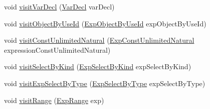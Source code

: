 \begin{DoxyCompactItemize}
\item 
void \hyperlink{classorg_1_1tzi_1_1use_1_1analysis_1_1coverage_1_1_abstract_coverage_visitor_abaab1e59addef8d8b34b31d113a7fd7b}{visit\-Var\-Decl} (\hyperlink{classorg_1_1tzi_1_1use_1_1uml_1_1ocl_1_1expr_1_1_var_decl}{Var\-Decl} var\-Decl)
\item 
void \hyperlink{classorg_1_1tzi_1_1use_1_1analysis_1_1coverage_1_1_abstract_coverage_visitor_a5b4a9ec8d6407ecd1ffbec91043926cb}{visit\-Object\-By\-Use\-Id} (\hyperlink{classorg_1_1tzi_1_1use_1_1uml_1_1ocl_1_1expr_1_1_exp_object_by_use_id}{Exp\-Object\-By\-Use\-Id} exp\-Object\-By\-Use\-Id)
\item 
void \hyperlink{classorg_1_1tzi_1_1use_1_1analysis_1_1coverage_1_1_abstract_coverage_visitor_a6e577a62aa06be5659d79f95e48a6cc8}{visit\-Const\-Unlimited\-Natural} (\hyperlink{classorg_1_1tzi_1_1use_1_1uml_1_1ocl_1_1expr_1_1_exp_const_unlimited_natural}{Exp\-Const\-Unlimited\-Natural} expression\-Const\-Unlimited\-Natural)
\item 
void \hyperlink{classorg_1_1tzi_1_1use_1_1analysis_1_1coverage_1_1_abstract_coverage_visitor_adb13b0e5068f701382e11cfcaaca5a85}{visit\-Select\-By\-Kind} (\hyperlink{classorg_1_1tzi_1_1use_1_1uml_1_1ocl_1_1expr_1_1_exp_select_by_kind}{Exp\-Select\-By\-Kind} exp\-Select\-By\-Kind)
\item 
void \hyperlink{classorg_1_1tzi_1_1use_1_1analysis_1_1coverage_1_1_abstract_coverage_visitor_a87403c1fd350df93199e2386861985b1}{visit\-Exp\-Select\-By\-Type} (\hyperlink{classorg_1_1tzi_1_1use_1_1uml_1_1ocl_1_1expr_1_1_exp_select_by_type}{Exp\-Select\-By\-Type} exp\-Select\-By\-Type)
\item 
void \hyperlink{classorg_1_1tzi_1_1use_1_1analysis_1_1coverage_1_1_abstract_coverage_visitor_a08e109d736a0611ccfb2af2678b4ef81}{visit\-Range} (\hyperlink{classorg_1_1tzi_1_1use_1_1uml_1_1ocl_1_1expr_1_1_exp_range}{Exp\-Range} exp)
\end{DoxyCompactItemize}
